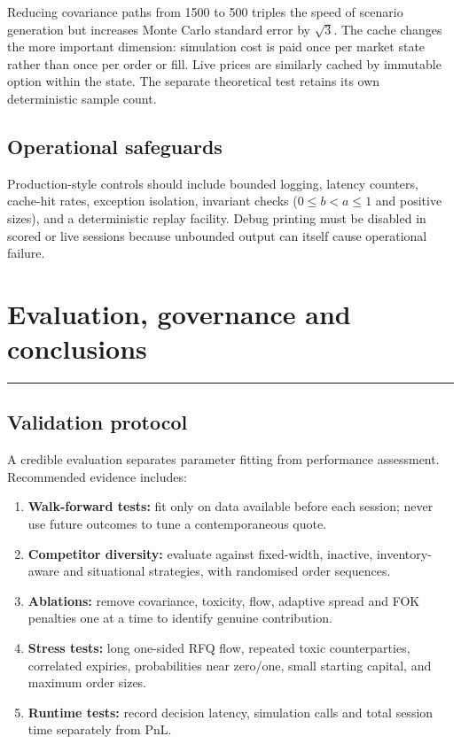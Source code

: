 \documentclass[10pt,a4paper]{article}
\newcommand{\1}{\mathbf{1}}
\newcommand{\sectionrule}{\vspace{-2pt}\noindent\color{navy}\rule{\textwidth}{0.7pt}\color{black}\vspace{2pt}}
\begin{document}
Reducing covariance paths from 1500 to 500 triples the speed of scenario generation
but increases Monte Carlo standard error by $\sqrt3$.  The cache changes the more
important dimension: simulation cost is paid once per market state rather than once
per order or fill.  Live prices are similarly cached by immutable option within the
state.  The separate theoretical test retains its own deterministic sample count.

\subsection{Operational safeguards}
Production-style controls should include bounded logging, latency counters, cache-hit
rates, exception isolation, invariant checks ($0\le b<a\le1$ and positive sizes), and
a deterministic replay facility.  Debug printing must be disabled in scored or live
sessions because unbounded output can itself cause operational failure.

\clearpage

\section{Evaluation, governance and conclusions}
\sectionrule

\subsection{Validation protocol}
A credible evaluation separates parameter fitting from performance assessment.
Recommended evidence includes:
\begin{enumerate}
  \item \textbf{Walk-forward tests:} fit only on data available before each session;
  never use future outcomes to tune a contemporaneous quote.
  \item \textbf{Competitor diversity:} evaluate against fixed-width, inactive,
  inventory-aware and situational strategies, with randomised order sequences.
  \item \textbf{Ablations:} remove covariance, toxicity, flow, adaptive spread and FOK
  penalties one at a time to identify genuine contribution.
  \item \textbf{Stress tests:} long one-sided RFQ flow, repeated toxic counterparties,
  correlated expiries, probabilities near zero/one, small starting capital, and maximum
  order sizes.
  \item \textbf{Runtime tests:} record decision latency, simulation calls and total
  session time separately from PnL.
\end{enumerate}
\end{document}

